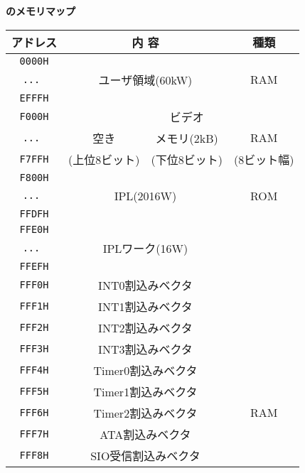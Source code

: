 \begin{center}
{\bf \tac のメモリマップ} \\
\begin{tabular}{|c|c|c|c|}
\hline
アドレス    & \multicolumn{2}{|c|}{内 容}              & 種類 \\
\hline
{\tt 0000H} & \multicolumn{2}{|c|}{}                   &      \\
{\tt ...  } & \multicolumn{2}{|c|}{ユーザ領域(60kW)}   & RAM  \\
{\tt EFFFH} & \multicolumn{2}{|c|}{}                   &      \\
\hline
{\tt F000H} &                  &  ビデオ               &      \\
{\tt ...  } &    空き          &  メモリ(2kB)          & RAM  \\
{\tt F7FFH} &    (上位8ビット) &  (下位8ビット)        &(8ビット幅) \\
\hline
{\tt F800H} & \multicolumn{2}{|c|}{}                   &      \\
{\tt ...  } & \multicolumn{2}{|c|}{IPL(2016W)}         & ROM  \\
{\tt FFDFH} & \multicolumn{2}{|c|}{}                   &      \\
\hline
{\tt FFE0H} & \multicolumn{2}{|c|}{}                   &      \\
{\tt ...  } & \multicolumn{2}{|c|}{IPLワーク(16W)}     &      \\
{\tt FFEFH} & \multicolumn{2}{|c|}{}                   &      \\
\cline{1-3}
{\tt FFF0H} & \multicolumn{2}{|c|}{INT0割込みベクタ}   &      \\
\cline{1-3}
{\tt FFF1H} & \multicolumn{2}{|c|}{INT1割込みベクタ}   &      \\
\cline{1-3}
{\tt FFF2H} & \multicolumn{2}{|c|}{INT2割込みベクタ}   &      \\
\cline{1-3}
{\tt FFF3H} & \multicolumn{2}{|c|}{INT3割込みベクタ}   &      \\
\cline{1-3}
{\tt FFF4H} & \multicolumn{2}{|c|}{Timer0割込みベクタ} &      \\
\cline{1-3}
{\tt FFF5H} & \multicolumn{2}{|c|}{Timer1割込みベクタ} &      \\
\cline{1-3}
{\tt FFF6H} & \multicolumn{2}{|c|}{Timer2割込みベクタ} & RAM  \\
\cline{1-3}
{\tt FFF7H} & \multicolumn{2}{|c|}{ATA割込みベクタ}    &      \\
\cline{1-3}
{\tt FFF8H} & \multicolumn{2}{|c|}{SIO受信割込みベクタ}&      \\

\end{tabular}
\end{center}
